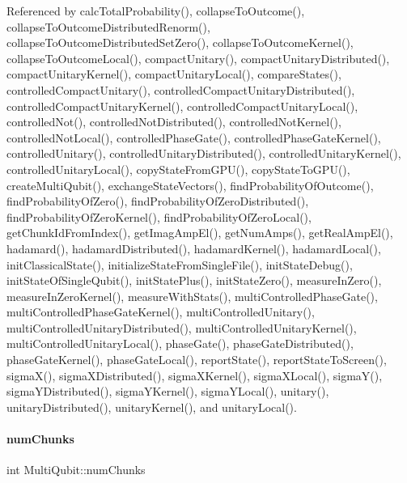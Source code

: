 Referenced by calc\+Total\+Probability(), collapse\+To\+Outcome(), collapse\+To\+Outcome\+Distributed\+Renorm(), collapse\+To\+Outcome\+Distributed\+Set\+Zero(), collapse\+To\+Outcome\+Kernel(), collapse\+To\+Outcome\+Local(), compact\+Unitary(), compact\+Unitary\+Distributed(), compact\+Unitary\+Kernel(), compact\+Unitary\+Local(), compare\+States(), controlled\+Compact\+Unitary(), controlled\+Compact\+Unitary\+Distributed(), controlled\+Compact\+Unitary\+Kernel(), controlled\+Compact\+Unitary\+Local(), controlled\+Not(), controlled\+Not\+Distributed(), controlled\+Not\+Kernel(), controlled\+Not\+Local(), controlled\+Phase\+Gate(), controlled\+Phase\+Gate\+Kernel(), controlled\+Unitary(), controlled\+Unitary\+Distributed(), controlled\+Unitary\+Kernel(), controlled\+Unitary\+Local(), copy\+State\+From\+G\+P\+U(), copy\+State\+To\+G\+P\+U(), create\+Multi\+Qubit(), exchange\+State\+Vectors(), find\+Probability\+Of\+Outcome(), find\+Probability\+Of\+Zero(), find\+Probability\+Of\+Zero\+Distributed(), find\+Probability\+Of\+Zero\+Kernel(), find\+Probability\+Of\+Zero\+Local(), get\+Chunk\+Id\+From\+Index(), get\+Imag\+Amp\+El(), get\+Num\+Amps(), get\+Real\+Amp\+El(), hadamard(), hadamard\+Distributed(), hadamard\+Kernel(), hadamard\+Local(), init\+Classical\+State(), initialize\+State\+From\+Single\+File(), init\+State\+Debug(), init\+State\+Of\+Single\+Qubit(), init\+State\+Plus(), init\+State\+Zero(), measure\+In\+Zero(), measure\+In\+Zero\+Kernel(), measure\+With\+Stats(), multi\+Controlled\+Phase\+Gate(), multi\+Controlled\+Phase\+Gate\+Kernel(), multi\+Controlled\+Unitary(), multi\+Controlled\+Unitary\+Distributed(), multi\+Controlled\+Unitary\+Kernel(), multi\+Controlled\+Unitary\+Local(), phase\+Gate(), phase\+Gate\+Distributed(), phase\+Gate\+Kernel(), phase\+Gate\+Local(), report\+State(), report\+State\+To\+Screen(), sigma\+X(), sigma\+X\+Distributed(), sigma\+X\+Kernel(), sigma\+X\+Local(), sigma\+Y(), sigma\+Y\+Distributed(), sigma\+Y\+Kernel(), sigma\+Y\+Local(), unitary(), unitary\+Distributed(), unitary\+Kernel(), and unitary\+Local().

\mbox{\label{structMultiQubit_acd43f2f57991709c9e94f73662c972b2}} 
\paragraph{\texorpdfstring{num\+Chunks}{numChunks}}
{\footnotesize\ttfamily int Multi\+Qubit\+::num\+Chunks}



